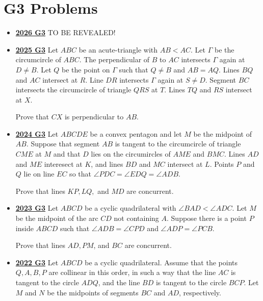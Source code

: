 \documentclass[11pt]{scrartcl}
\begin{document}
\section*{G3 Problems}  \label{G3}
\begin{itemize}[leftmargin=*]


\item \href{https://www.imo-official.org/assets/documents/problems/2026/IMO2026SL.pdf}{\textbf{2026 G3}} TO BE REVEALED!

\item \href{https://artofproblemsolving.com/community/c6h3866884p38677024}{\textbf{2025 G3}} Let $ABC$ be an acute-triangle with $AB<AC$. Let $\Gamma$ be the circumcircle of $ABC$. The perpendicular of $B$ to $AC$ intersects $\Gamma$ again at $D\ne B$. Let $Q$ be the point on $\Gamma$ such that $Q\ne B$ and $AB=AQ$. Lines $BQ$ and $AC$ intersect at $R$. Line $DR$ intersects $\Gamma$ again at $S\ne D$. Segment $BC$ intersects the circumcircle of triangle $QRS$ at $T$. Lines $TQ$ and $RS$ intersect at $X$.

    Prove that $CX$ is perpendicular to $AB$.


\item \href{https://artofproblemsolving.com/community/c6h3610478p35341061}{\textbf{2024 G3}} Let $ABCDE$ be a convex pentagon and let $M$ be the midpoint of $AB$. Suppose that segment $AB$ is tangent to the circumcircle of triangle $CME$ at $M$ and that $D$ lies on the circumircles of $AME$ and $BMC$. Lines $AD$ and $ME$ interesect at $K$, and lines $BD$ and $MC$ intersect at $L$. Points $P$ and $Q$ lie on line $EC$ so that $\angle PDC = \angle EDQ = \angle ADB$.

Prove that lines $KP, LQ,$ and $MD$ are concurrent.
\item \href{https://artofproblemsolving.com/community/c6h3359737p31218405}{\textbf{2023 G3}} Let $ABCD$ be a cyclic quadrilateral with $\angle BAD < \angle ADC$. Let $M$ be the midpoint of the arc $CD$ not containing $A$. Suppose there is a point $P$ inside $ABCD$ such that $\angle ADB = \angle CPD$ and $\angle ADP = \angle PCB$.

Prove that lines $AD, PM$, and $BC$ are concurrent.
    \item \href{https://artofproblemsolving.com/community/c6h3107322p28104239}{\textbf{2022 G3}} Let $ABCD$ be a cyclic quadrilateral. Assume that the points $Q, A, B, P$ are collinear in this order, in such a way that the line $AC$ is tangent to the circle $ADQ$, and the line $BD$ is tangent to the circle $BCP$. Let $M$ and $N$ be the midpoints of segments $BC$ and $AD$, respectively. 
    

\end{itemize}
\end{document}
